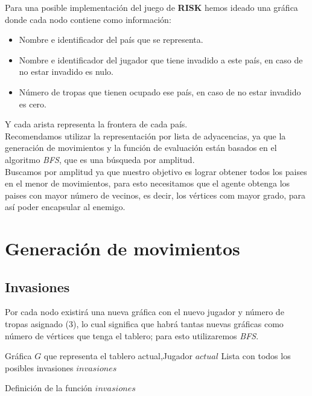 \documentclass[12pt]{article}
\begin{document}
Para una posible implementaci\'on del juego de \textbf{RISK} hemos ideado una gr\'afica donde cada nodo
contiene como informaci\'on:
\begin{itemize}
 \item Nombre e identificador del pa\'is que se representa.
 \item Nombre e identificador del jugador que tiene invadido a este pa\'is, en caso de no estar invadido es nulo.
 \item N\'umero de tropas que tienen ocupado ese pa\'is, en caso de no estar invadido es cero.
\end{itemize}
Y cada arista representa la frontera de cada pa\'is.\\
Recomendamos utilizar la representaci\'on por lista de adyacencias, ya que la generaci\'on de movimientos y
la funci\'on de evaluaci\'on est\'an basados en el algoritmo \textit{BFS}, que es una b\'usqueda por amplitud.\\
Buscamos por amplitud ya que nuestro objetivo es lograr obtener todos los paises en el menor de movimientos, 
para esto necesitamos que el agente obtenga los paises con mayor n\'umero de vecinos, es decir, los v\'ertices
com mayor grado, para as\'i poder encapsular al enemigo.

\section{Generaci\'on de movimientos}

\subsection{Invasiones}

Por cada nodo existir\'a una nueva gr\'afica con el nuevo jugador y n\'umero de tropas asignado (3), lo
cual significa que habr\'a tantas nuevas gr\'aficas como n\'umero de v\'ertices que tenga el tablero; para
esto utilizaremos \textit{BFS}.

\begin{algorithm}
\begin{algorithmic}[1]
\REQUIRE Gr\'afica $G$ que representa el tablero actual,Jugador $actual$
\ENSURE Lista con todos los posibles invasiones
\ENDFOR
{}
\ENDIF
{}
\ENDIF
{}
\ENDIF
\ENDFOR
\ENDWHILE
\RETURN $invasiones$
\end{algorithmic}
\caption{Definici\'on de la funci\'on $invasiones$}
\label{invasiones}
\end{algorithm}
\end{document}
